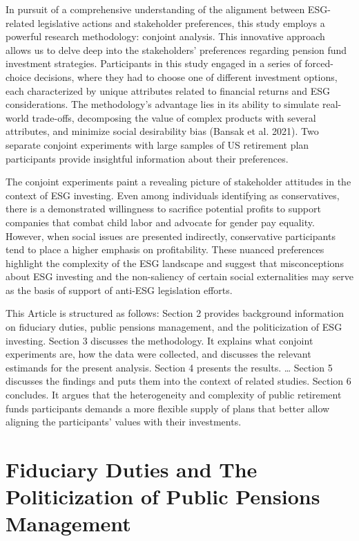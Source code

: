 \documentclass[
  12pt,
]{article}
\begin{document}
In pursuit of a comprehensive understanding of the alignment between ESG-related legislative actions and stakeholder preferences, this study employs a powerful research methodology: conjoint analysis. This innovative approach allows us to delve deep into the stakeholders' preferences regarding pension fund investment strategies. Participants in this study engaged in a series of forced-choice decisions, where they had to choose one of different investment options, each characterized by unique attributes related to financial returns and ESG considerations. The methodology's advantage lies in its ability to simulate real-world trade-offs, decomposing the value of complex products with several attributes, and minimize social desirability bias (Bansak et al. 2021). Two separate conjoint experiments with large samples of US retirement plan participants provide insightful information about their preferences.

The conjoint experiments paint a revealing picture of stakeholder attitudes in the context of ESG investing. Even among individuals identifying as conservatives, there is a demonstrated willingness to sacrifice potential profits to support companies that combat child labor and advocate for gender pay equality. However, when social issues are presented indirectly, conservative participants tend to place a higher emphasis on profitability. These nuanced preferences highlight the complexity of the ESG landscape and suggest that misconceptions about ESG investing and the non-saliency of certain social externalities may serve as the basis of support of anti-ESG legislation efforts.

This Article is structured as follows: Section 2 provides background information on fiduciary duties, public pensions management, and the politicization of ESG investing. Section 3 discusses the methodology. It explains what conjoint experiments are, how the data were collected, and discusses the relevant estimands for the present analysis. Section 4 presents the results. \ldots{} Section 5 discusses the findings and puts them into the context of related studies. Section 6 concludes. It argues that the heterogeneity and complexity of public retirement funds participants demands a more flexible supply of plans that better allow aligning the participants' values with their investments.

\hypertarget{fiduciary-duties-and-the-politicization-of-public-pensions-management}{%
\section{Fiduciary Duties and The Politicization of Public Pensions Management}\label{fiduciary-duties-and-the-politicization-of-public-pensions-management}}
\end{document}
